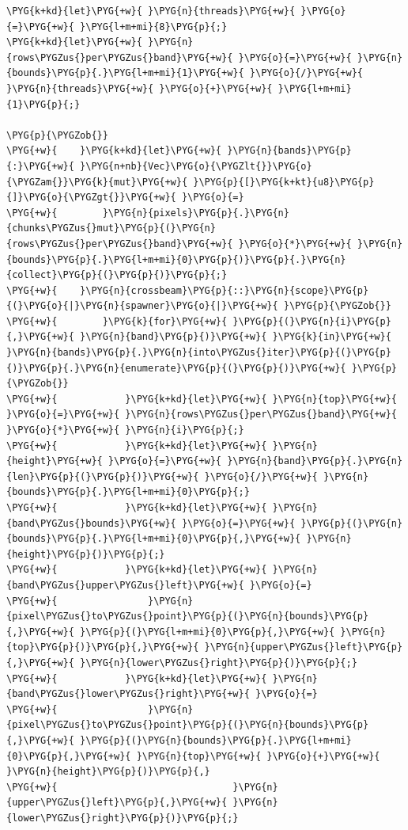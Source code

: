\begin{Verbatim}[commandchars=\\\{\},breaklines=true,breakanywhere=true,fontsize=\codefont,xleftmargin=17bp]
\PYG{k+kd}{let}\PYG{+w}{ }\PYG{n}{threads}\PYG{+w}{ }\PYG{o}{=}\PYG{+w}{ }\PYG{l+m+mi}{8}\PYG{p}{;}
\PYG{k+kd}{let}\PYG{+w}{ }\PYG{n}{rows\PYGZus{}per\PYGZus{}band}\PYG{+w}{ }\PYG{o}{=}\PYG{+w}{ }\PYG{n}{bounds}\PYG{p}{.}\PYG{l+m+mi}{1}\PYG{+w}{ }\PYG{o}{/}\PYG{+w}{ }\PYG{n}{threads}\PYG{+w}{ }\PYG{o}{+}\PYG{+w}{ }\PYG{l+m+mi}{1}\PYG{p}{;}

\PYG{p}{\PYGZob{}}
\PYG{+w}{    }\PYG{k+kd}{let}\PYG{+w}{ }\PYG{n}{bands}\PYG{p}{:}\PYG{+w}{ }\PYG{n+nb}{Vec}\PYG{o}{\PYGZlt{}}\PYG{o}{\PYGZam{}}\PYG{k}{mut}\PYG{+w}{ }\PYG{p}{[}\PYG{k+kt}{u8}\PYG{p}{]}\PYG{o}{\PYGZgt{}}\PYG{+w}{ }\PYG{o}{=}
\PYG{+w}{        }\PYG{n}{pixels}\PYG{p}{.}\PYG{n}{chunks\PYGZus{}mut}\PYG{p}{(}\PYG{n}{rows\PYGZus{}per\PYGZus{}band}\PYG{+w}{ }\PYG{o}{*}\PYG{+w}{ }\PYG{n}{bounds}\PYG{p}{.}\PYG{l+m+mi}{0}\PYG{p}{)}\PYG{p}{.}\PYG{n}{collect}\PYG{p}{(}\PYG{p}{)}\PYG{p}{;}
\PYG{+w}{    }\PYG{n}{crossbeam}\PYG{p}{::}\PYG{n}{scope}\PYG{p}{(}\PYG{o}{|}\PYG{n}{spawner}\PYG{o}{|}\PYG{+w}{ }\PYG{p}{\PYGZob{}}
\PYG{+w}{        }\PYG{k}{for}\PYG{+w}{ }\PYG{p}{(}\PYG{n}{i}\PYG{p}{,}\PYG{+w}{ }\PYG{n}{band}\PYG{p}{)}\PYG{+w}{ }\PYG{k}{in}\PYG{+w}{ }\PYG{n}{bands}\PYG{p}{.}\PYG{n}{into\PYGZus{}iter}\PYG{p}{(}\PYG{p}{)}\PYG{p}{.}\PYG{n}{enumerate}\PYG{p}{(}\PYG{p}{)}\PYG{+w}{ }\PYG{p}{\PYGZob{}}
\PYG{+w}{            }\PYG{k+kd}{let}\PYG{+w}{ }\PYG{n}{top}\PYG{+w}{ }\PYG{o}{=}\PYG{+w}{ }\PYG{n}{rows\PYGZus{}per\PYGZus{}band}\PYG{+w}{ }\PYG{o}{*}\PYG{+w}{ }\PYG{n}{i}\PYG{p}{;}
\PYG{+w}{            }\PYG{k+kd}{let}\PYG{+w}{ }\PYG{n}{height}\PYG{+w}{ }\PYG{o}{=}\PYG{+w}{ }\PYG{n}{band}\PYG{p}{.}\PYG{n}{len}\PYG{p}{(}\PYG{p}{)}\PYG{+w}{ }\PYG{o}{/}\PYG{+w}{ }\PYG{n}{bounds}\PYG{p}{.}\PYG{l+m+mi}{0}\PYG{p}{;}
\PYG{+w}{            }\PYG{k+kd}{let}\PYG{+w}{ }\PYG{n}{band\PYGZus{}bounds}\PYG{+w}{ }\PYG{o}{=}\PYG{+w}{ }\PYG{p}{(}\PYG{n}{bounds}\PYG{p}{.}\PYG{l+m+mi}{0}\PYG{p}{,}\PYG{+w}{ }\PYG{n}{height}\PYG{p}{)}\PYG{p}{;}
\PYG{+w}{            }\PYG{k+kd}{let}\PYG{+w}{ }\PYG{n}{band\PYGZus{}upper\PYGZus{}left}\PYG{+w}{ }\PYG{o}{=}
\PYG{+w}{                }\PYG{n}{pixel\PYGZus{}to\PYGZus{}point}\PYG{p}{(}\PYG{n}{bounds}\PYG{p}{,}\PYG{+w}{ }\PYG{p}{(}\PYG{l+m+mi}{0}\PYG{p}{,}\PYG{+w}{ }\PYG{n}{top}\PYG{p}{)}\PYG{p}{,}\PYG{+w}{ }\PYG{n}{upper\PYGZus{}left}\PYG{p}{,}\PYG{+w}{ }\PYG{n}{lower\PYGZus{}right}\PYG{p}{)}\PYG{p}{;}
\PYG{+w}{            }\PYG{k+kd}{let}\PYG{+w}{ }\PYG{n}{band\PYGZus{}lower\PYGZus{}right}\PYG{+w}{ }\PYG{o}{=}
\PYG{+w}{                }\PYG{n}{pixel\PYGZus{}to\PYGZus{}point}\PYG{p}{(}\PYG{n}{bounds}\PYG{p}{,}\PYG{+w}{ }\PYG{p}{(}\PYG{n}{bounds}\PYG{p}{.}\PYG{l+m+mi}{0}\PYG{p}{,}\PYG{+w}{ }\PYG{n}{top}\PYG{+w}{ }\PYG{o}{+}\PYG{+w}{ }\PYG{n}{height}\PYG{p}{)}\PYG{p}{,}
\PYG{+w}{                               }\PYG{n}{upper\PYGZus{}left}\PYG{p}{,}\PYG{+w}{ }\PYG{n}{lower\PYGZus{}right}\PYG{p}{)}\PYG{p}{;}


\end{Verbatim}
